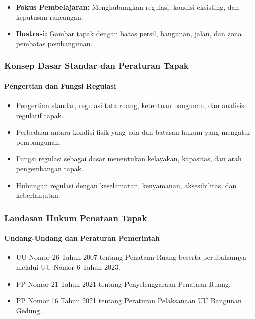 \documentclass[../main.tex]{subfiles}
\begin{document}
\begin{frame}[mytitle=center, c, mycolor=digiPH_cream]
	\titlepage
	\begin{itemize}
		\item \textbf{Fokus Pembelajaran:} Menghubungkan regulasi, kondisi eksisting, dan keputusan rancangan.
		\item \textbf{Ilustrasi:} Gambar tapak dengan batas persil, bangunan, jalan, dan zona pembatas pembangunan.
	\end{itemize}
\end{frame}

\begin{frame}[mytitle=standard, t, mycolor=digiPH_gray]
	\frametitle{Konsep Dasar Standar dan Peraturan Tapak}
	\framesubtitle{Pengertian dan Fungsi Regulasi}
	\begin{itemize}
		\item Pengertian standar, regulasi tata ruang, ketentuan bangunan, dan analisis regulatif tapak.
		\item Perbedaan antara kondisi fisik yang ada dan batasan hukum yang mengatur pembangunan.
		\item Fungsi regulasi sebagai dasar menentukan kelayakan, kapasitas, dan arah pengembangan tapak.
		\item Hubungan regulasi dengan keselamatan, kenyamanan, aksesibilitas, dan keberlanjutan.
	\end{itemize}
\end{frame}

\begin{frame}[mytitle=standard, t, mycolor=white]
	\frametitle{Landasan Hukum Penataan Tapak}
	\framesubtitle{Undang-Undang dan Peraturan Pemerintah}
	\begin{itemize}
		\item UU Nomor 26 Tahun 2007 tentang Penataan Ruang beserta perubahannya melalui UU Nomor 6 Tahun 2023.
		\item PP Nomor 21 Tahun 2021 tentang Penyelenggaraan Penataan Ruang.
		\item PP Nomor 16 Tahun 2021 tentang Peraturan Pelaksanaan UU Bangunan Gedung.
	\end{itemize}
\end{frame}
\end{document}
